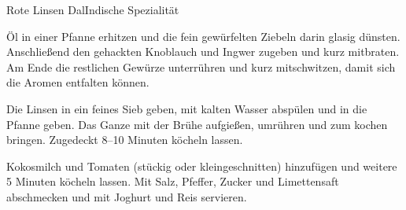 \begin{recipe}{Rote Linsen Dal}{Indische Spezialität}
  \label{Dal}
  \inglist

  \steps

  Öl in einer Pfanne erhitzen und die fein gewürfelten Ziebeln darin glasig
  dünsten. Anschließend den gehackten Knoblauch und Ingwer zugeben und kurz
  mitbraten. Am Ende die restlichen Gewürze unterrühren und kurz mitschwitzen,
  damit sich die Aromen entfalten können.

  Die Linsen in ein feines Sieb geben, mit kalten Wasser abspülen und in die
  Pfanne geben. Das Ganze mit der Brühe aufgießen, umrühren und zum kochen 
  bringen. Zugedeckt 8--10 Minuten köcheln lassen.

  Kokosmilch und Tomaten (stückig oder kleingeschnitten) hinzufügen und weitere
  5 Minuten köcheln lassen. Mit Salz, Pfeffer, Zucker und Limettensaft
  abschmecken und mit Joghurt und Reis servieren.

\end{recipe}
